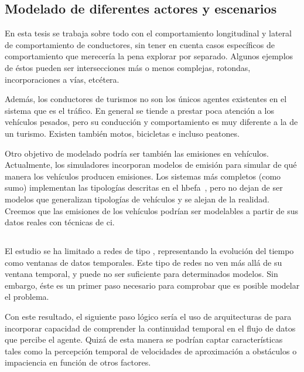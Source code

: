 \subsection{Modelado de diferentes actores y escenarios}

En esta tesis se trabaja sobre todo con el comportamiento longitudinal y lateral de comportamiento de conductores, sin tener en cuenta casos específicos de comportamiento que merecería la pena explorar por separado. Algunos ejemplos de éstos pueden ser intersecciones más o menos complejas, rotondas, incorporaciones a vías, etcétera.

Además, los conductores de turismos no son los únicos agentes existentes en el sistema que es el tráfico. En general se tiende a prestar poca atención a los vehículos pesados, pero su conducción y comportamiento es muy diferente a la de un turismo. Existen también motos, bicicletas e incluso peatones.

Otro objetivo de modelado podría ser también las emisiones en vehículos. Actualmente, los simuladores incorporan modelos de emisión para simular de qué manera los vehículos producen emisiones. Los sistemas más completos (como \gls{sumo}) implementan las tipologías descritas en el \gls{hbefa}~\cite{de2004modelling}, pero no dejan de ser modelos que generalizan tipologías de vehículos y se alejan de la realidad. Creemos que las emisiones de los vehículos podrían ser modelables a partir de sus datos reales con técnicas de \ac{ci}.

\subsection{}

El estudio se ha limitado a redes de tipo \textit{}, representando la evolución del tiempo como ventanas de datos temporales. Este tipo de redes no ven más allá de su ventana temporal, y puede no ser suficiente para determinados modelos. Sin embargo, éste es un primer paso necesario para comprobar que es posible modelar el problema.

Con este resultado, el siguiente paso lógico sería el uso de arquitecturas de  para incorporar capacidad de comprender la continuidad temporal en el flujo de datos que percibe el agente. Quizá de esta manera se podrían captar características tales como la percepción temporal de velocidades de aproximación a obstáculos o impaciencia en función de otros factores.